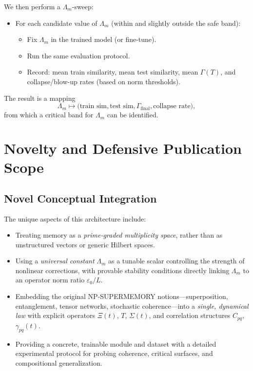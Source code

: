 \documentclass[11pt]{article}
\begin{document}
We then perform a $\Lambda_m$-sweep:
\begin{itemize}[leftmargin=1.5em]
\item For each candidate value of $\Lambda_m$ (within and slightly outside the safe band):
\begin{itemize}[leftmargin=0.8em]
\item Fix $\Lambda_m$ in the trained model (or fine-tune).
\item Run the same evaluation protocol.
\item Record: mean train similarity, mean test similarity, mean $\Gamma(T)$, and collapse/blow-up rates (based on norm thresholds).
\end{itemize}
\end{itemize}

The result is a mapping
\[
\Lambda_m \mapsto \Big(\text{train sim}, \text{test sim}, \Gamma_{\mathrm{final}},
\text{collapse rate}\Big),
\]
from which a critical band for $\Lambda_m$ can be identified.

\section{Novelty and Defensive Publication Scope}

\subsection{Novel Conceptual Integration}

The unique aspects of this architecture include:
\begin{itemize}[leftmargin=1.5em]
\item Treating memory as a \emph{prime-graded multiplicity space}, rather than as unstructured vectors or generic Hilbert spaces.
\item Using a \emph{universal constant} $\Lambda_m$ as a tunable scalar controlling the strength of nonlinear corrections, with provable stability conditions directly linking $\Lambda_m$ to an operator norm ratio $\varepsilon_0/L$.
\item Embedding the original NP-SUPERMEMORY notions---superposition, entanglement, tensor networks, stochastic coherence---into a \emph{single, dynamical law} with explicit operators $\Xi(t)$, $T$, $\Sigma(t)$, and correlation structures $C_{pq}$, $\gamma_{pq}(t)$.
\item Providing a concrete, trainable module and dataset with a detailed experimental protocol for probing coherence, critical surfaces, and compositional generalization.
\end{itemize}
\end{document}

